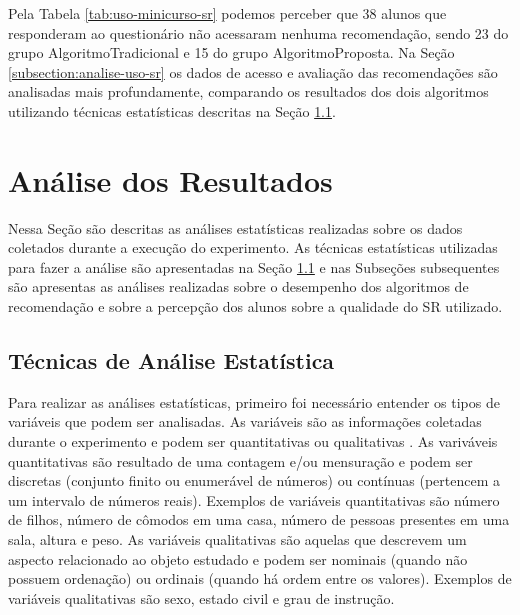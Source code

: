 Pela Tabela \ref{tab:uso-minicurso-sr} podemos perceber que 38 alunos que responderam ao questionário não acessaram nenhuma
recomendação, sendo 23 do grupo AlgoritmoTradicional e 15 do grupo AlgoritmoProposta. Na Seção
\ref{subsection:analise-uso-sr} os dados de acesso e avaliação das recomendações são analisadas mais profundamente,
comparando os resultados dos dois algoritmos utilizando técnicas estatísticas descritas na Seção \ref{subsection:tecnicas-analise-estatistica}.

\section{Análise dos Resultados}\label{section:analise-experimento}

Nessa Seção são descritas as análises estatísticas realizadas sobre os dados coletados durante a execução do experimento.
As técnicas estatísticas utilizadas para fazer a análise são apresentadas na Seção \ref{subsection:tecnicas-analise-estatistica}
e nas Subseções subsequentes são apresentas as análises realizadas sobre o desempenho dos algoritmos de recomendação e sobre
a percepção dos alunos sobre a qualidade do SR utilizado.

\subsection{Técnicas de Análise Estatística}\label{subsection:tecnicas-analise-estatistica}

Para realizar as análises estatísticas, primeiro foi necessário entender os tipos de variáveis que podem ser analisadas.
As variáveis são as informações coletadas durante o experimento e podem ser quantitativas ou qualitativas \cite{bussab2012morettin}.
As variváveis quantitativas são resultado de uma contagem e/ou mensuração \cite{bussab2012morettin} e podem ser discretas
(conjunto finito ou enumerável de números) ou contínuas (pertencem a um intervalo de números reais). Exemplos de variáveis
quantitativas são número de filhos, número de cômodos em uma casa, número de pessoas presentes em uma sala, altura e peso.
As variáveis qualitativas são aquelas que descrevem um aspecto relacionado ao objeto estudado \cite{bussab2012morettin} e podem ser
nominais (quando não possuem ordenação) ou ordinais (quando há ordem entre os valores). Exemplos de variáveis qualitativas
são sexo, estado civil e grau de instrução.

